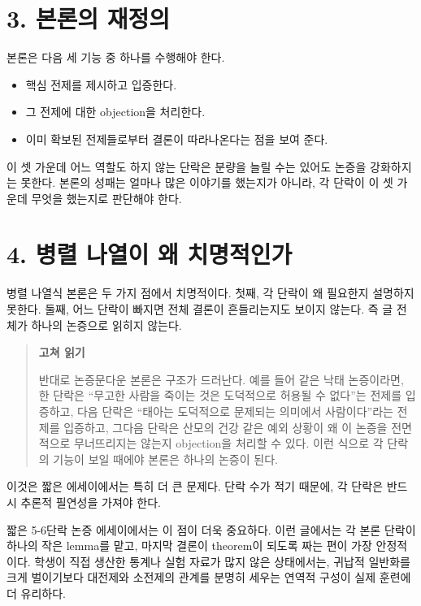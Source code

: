 \section{3. 본론의 재정의}\label{3-uxbcf8uxb860uxc758-uxc7acuxc815uxc758}

본론은 다음 세 기능 중 하나를 수행해야 한다.

\begin{itemize}
\tightlist
\item
  핵심 전제를 제시하고 입증한다.
\item
  그 전제에 대한 objection을 처리한다.
\item
  이미 확보된 전제들로부터 결론이 따라나온다는 점을 보여 준다.
\end{itemize}

이 셋 가운데 어느 역할도 하지 않는 단락은 분량을 늘릴 수는 있어도 논증을 강화하지는 못한다. 본론의 성패는 얼마나 많은 이야기를 했는지가 아니라, 각 단락이 이 셋 가운데 무엇을 했는지로 판단해야 한다.

\section{4. 병렬 나열이 왜 치명적인가}\label{4-uxbcd1uxb82c-uxb098uxc5f4uxc774-uxc65c-uxce58uxba85uxc801uxc778uxac00}

병렬 나열식 본론은 두 가지 점에서 치명적이다. 첫째, 각 단락이 왜 필요한지 설명하지 못한다. 둘째, 어느 단락이 빠지면 전체 결론이 흔들리는지도 보이지 않는다. 즉 글 전체가 하나의 논증으로 읽히지 않는다.

\begin{quote}
\textbf{고쳐 읽기}

반대로 논증문다운 본론은 구조가 드러난다. 예를 들어 같은 낙태 논증이라면, 한 단락은 ``무고한 사람을 죽이는 것은 도덕적으로 허용될 수 없다''는 전제를 입증하고, 다음 단락은 ``태아는 도덕적으로 문제되는 의미에서 사람이다''라는 전제를 입증하고, 그다음 단락은 산모의 건강 같은 예외 상황이 왜 이 논증을 전면적으로 무너뜨리지는 않는지 objection을 처리할 수 있다. 이런 식으로 각 단락의 기능이 보일 때에야 본론은 하나의 논증이 된다.
\end{quote}

이것은 짧은 에세이에서는 특히 더 큰 문제다. 단락 수가 적기 때문에, 각 단락은 반드시 추론적 필연성을 가져야 한다.

짧은 5-6단락 논증 에세이에서는 이 점이 더욱 중요하다. 이런 글에서는 각 본론 단락이 하나의 작은 lemma를 맡고, 마지막 결론이 theorem이 되도록 짜는 편이 가장 안정적이다. 학생이 직접 생산한 통계나 실험 자료가 많지 않은 상태에서는, 귀납적 일반화를 크게 벌이기보다 대전제와 소전제의 관계를 분명히 세우는 연역적 구성이 실제 훈련에 더 유리하다.

